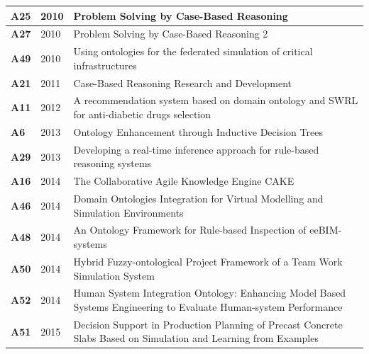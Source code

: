 {\begin{longtable}{ | m{1cm} | m{1.5cm} | m{12cm} | }
                    \hline
                    \textbf{A25} &2010 &Problem Solving by Case-Based Reasoning \\
                    \hline
                    \textbf{A27} &2010 &Problem Solving by Case-Based Reasoning 2 \\
                    \hline
                    \textbf{A49} &2010 &Using ontologies for the federated simulation of critical infrastructures \cite{tofani2010using} \\
                    \hline
                    \textbf{A21} &2011 &Case-Based Reasoning Research and Development \cite{wiratunga2011case} \\
                    \hline
                    \textbf{A11} &2012 &A recommendation system based on domain ontology and SWRL for anti-diabetic drugs selection \\
                    \hline
                    \textbf{A6} &2013 &Ontology Enhancement through Inductive Decision Trees \cite{chen2012recommendation} \\
                    \hline
                    \textbf{A29} &2013 &Developing a real-time inference approach for rule-based reasoning systems \cite{qiao2013developing} \\
                    \hline
                    \textbf{A16} &2014 &The Collaborative Agile Knowledge Engine CAKE \cite{bergmann2014collaborative} \\
                    \hline
                    \textbf{A46} &2014 &Domain Ontologies Integration for Virtual Modelling and Simulation Environments \cite{smirnov2014domain} \\
                    \hline
                    \textbf{A48} &2014 &An Ontology Framework for Rule-based Inspection of eeBIM-systems \cite{kadolsky2014ontology}\\
                    \hline
                    \textbf{A50} &2014 &Hybrid Fuzzy-ontological Project Framework of a Team Work Simulation System \cite{orlowski2014hybrid} \\
                    \hline
                    \textbf{A52} &2014 &Human System Integration Ontology: Enhancing Model Based Systems Engineering to Evaluate Human-system Performance \cite{orellana2014human}\\
                    \hline
                    \textbf{A51} &2015 &Decision Support in Production Planning of Precast Concrete Slabs Based on Simulation and Learning from Examples \cite{konczak2015decision} \\

\end{longtable}}

